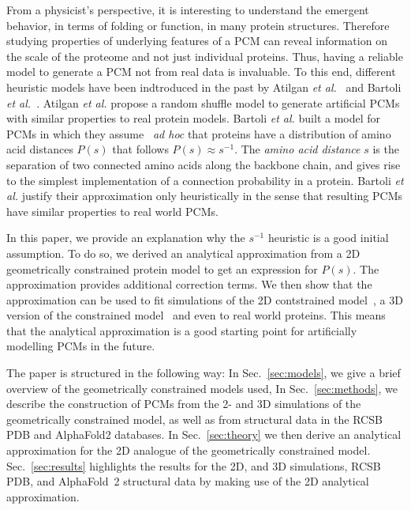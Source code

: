\documentclass[
reprint,
twocolumn,
amsmath,amssymb,superscriptaddress,aps,
pre]{revtex4-1}
\begin{document}
From a physicist's perspective, it is interesting to understand the emergent behavior, in terms of folding or function, in many protein structures. Therefore studying properties of underlying features of a PCM can reveal information on the scale of the proteome and not just individual proteins. Thus, having a reliable model to generate a PCM not from real data is invaluable. To this end, different heuristic models have been indtroduced in the past by Atilgan \textit{et al.}~\cite{atilgan2004smallworld} and Bartoli \textit{et al.}~\cite{bartoli2008effecta}. Atilgan \textit{et al.} propose a random shuffle model to generate artificial PCMs with similar properties to real protein models. Bartoli \textit{et al.} built a model for PCMs in which they assume ~\textit{ad hoc} that proteins have a distribution of amino acid distances $P(s)$ that follows $P(s) \approx s^{-1}$. The \textit{amino acid distance} $s$ is the separation of two connected amino acids along the backbone chain, and gives rise to the simplest implementation of a connection probability in a protein. Bartoli \textit{et al.} justify their approximation only heuristically in the sense that resulting PCMs have similar properties to real world PCMs. 

In this paper, we provide an explanation why the $s^{-1}$ heuristic is a good initial assumption. To do so, we derived an analytical approximation from a 2D geometrically constrained protein model to get an expression for $P(s)$. The approximation provides additional correction terms. We then show that the approximation can be used to fit simulations of the 2D contstrained model~\cite{molkenthin2016scaling}, a 3D version of the constrained model~\cite{molkenthin2020self} and even to real world proteins. This means that the analytical approximation is a good starting point for artificially modelling PCMs in the future. 



The paper is structured in the following way: In Sec.~\ref{sec:models}, we give a brief overview of the geometrically constrained models used, In Sec.~\ref{sec:methods}, we describe the construction of PCMs from the 2- and 3D simulations of the geometrically constrained model, as well as from structural data in the RCSB PDB and AlphaFold2 databases. In Sec.~\ref{sec:theory} we then derive an analytical approximation for the 2D analogue of the geometrically constrained model. Sec.~\ref{sec:results} highlights the results for the 2D, and 3D simulations, RCSB PDB, and AlphaFold~2 structural data by making use of the 2D analytical approximation.
\end{document}
